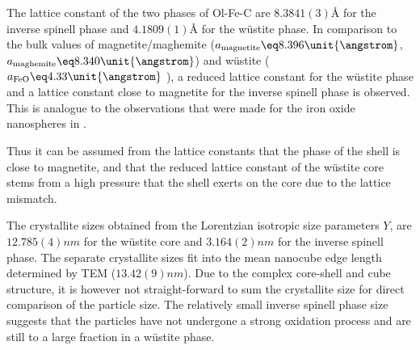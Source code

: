 \documentclass[\main/dresen_thesis.tex]{subfiles}
\begin{document}
    The lattice constant of the two phases of Ol-Fe-C are $8.3841(3) \unit{\angstrom}$ for the inverse spinell phase and $4.1809(1) \unit{\angstrom}$ for the w\"ustite phase.
    In comparison to the bulk values of magnetite/maghemite ($a_\mathrm{magnetite} \eq 8.396 \unit{\angstrom}$, $a_\mathrm{maghemite} \eq 8.340 \unit{\angstrom}$) \cite{Cornell_2003_Their} and w\"ustite ($a_\mathrm{FeO} \eq 4.33 \unit{\angstrom}$ \cite{Hentschel_1970_Stoich}), a reduced lattice constant for the w\"ustite phase and a lattice constant close to magnetite for the inverse spinell phase is observed.
    This is analogue to the observations that were made for the iron oxide nanospheres in .

    Thus it can be assumed from the lattice constants that the phase of the shell is close to magnetite, and that the reduced lattice constant of the w\"ustite core stems from a high pressure that the shell exerts on the core due to the lattice mismatch.

    The crystallite sizes obtained from the Lorentzian isotropic size parameters $Y$, are $12.785(4) \unit{nm}$ for the w\"ustite core and $3.164(2) \unit{nm}$ for the inverse spinell phase.
    The separate crystallite sizes fit into the mean nanocube edge length determined by TEM ($13.42(9) \unit{nm}$). 
    Due to the complex core-shell and cube structure, it is however not straight-forward to sum the crystallite size for direct comparison of the particle size.
    The relatively small inverse spinell phase size suggests that the particles have not undergone a strong oxidation process and are still to a large fraction in a w\"ustite phase.
\end{document}
